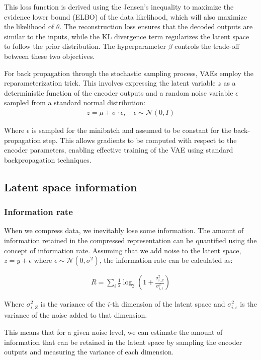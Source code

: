 \documentclass[conference,a4paper]{IEEEtran}
\begin{document}
This loss function is derived using the Jensen's inequality to maximize the evidence lower bound (ELBO) of the data likelihood, which will also maximize the likelihood of $\theta$. The reconstruction loss ensures that the decoded outputs are similar to the inputs, while the KL divergence term regularizes the latent space to follow the prior distribution. The hyperparameter $\beta$ controls the trade-off between these two objectives.

For back propagation through the stochastic sampling process, VAEs employ the reparameterization trick. This involves expressing the latent variable $z$ as a deterministic function of the encoder outputs and a random noise variable $\epsilon$ sampled from a standard normal distribution:
\begin{align}
z = \mu + \sigma \cdot \epsilon, \quad \epsilon \sim \mathcal{N}(0, I)
\end{align}

Where $\epsilon$ is sampled for the minibatch and assumed to be constant for the back-propagation step. This allows gradients to be computed with respect to the encoder parameters, enabling effective training of the VAE using standard backpropagation techniques.


\subsection{Latent space information}

\subsubsection{Information rate}

When we compress data, we inevitably lose some information. The amount of information retained in the compressed representation can be quantified using the concept of information rate. Assuming that we add noise to the latent space, $z = y + \epsilon$ where $\epsilon \sim \mathcal{N}(0, \sigma^2)$, the information rate can be calculated as:

\begin{align}
R = \sum_i \frac{1}{2} \log_2 \left(1 + \frac{\sigma_{i,Z}^2}{\sigma_{i, \epsilon}^2}\right)
\end{align}

Where $\sigma_{i,Z}^2$ is the variance of the $i$-th dimension of the latent space and $\sigma_{i, \epsilon}^2$ is the variance of the noise added to that dimension.

This means that for a given noise level, we can estimate the amount of information that can be retained in the latent space by sampling the encoder outputs and measuring the variance of each dimension.
\end{document}
